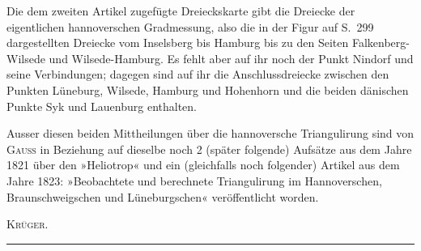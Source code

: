 \par\noindent\hspace*{\parindent}Die dem zweiten Artikel zugefügte Dreieckskarte gibt die Dreiecke der eigentlichen hannoverschen Gradmessung, also die in der Figur auf S.~299 dargestellten Dreiecke vom Inselsberg bis Hamburg bis zu den Seiten Falkenberg-Wilsede und Wilsede-Hamburg. Es fehlt aber auf ihr noch der Punkt Nindorf und seine Verbindungen; dagegen sind auf ihr die Anschlussdreiecke zwischen den Punkten Lüneburg, Wilsede, Hamburg und Hohenhorn und die beiden dänischen Punkte Syk und Lauenburg enthalten.
\par\noindent\hspace*{\parindent}Ausser diesen beiden Mittheilungen über die hannoversche Triangulirung sind von \textsc{Gauss} in Beziehung auf dieselbe noch 2 (später folgende) Aufsätze aus dem Jahre 1821 über den »Heliotrop« und ein (gleichfalls noch folgender) Artikel aus dem Jahre 1823: »Beobachtete und berechnete Triangulirung im Hannoverschen, Braunschweigschen und Lüneburgschen« veröffentlicht worden.
\par\noindent\hfill\textsc{Krüger}.\par
\endgroup
\begin{center}\rule{.16\linewidth}{.4pt}\end{center}
